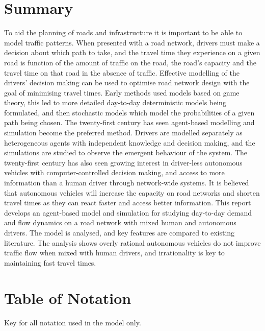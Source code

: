 \documentclass[12pt, a4paper, onecolumn]{article}
\begin{document}
\section*{Summary}
To aid the planning of roads and infrastructure it is important to be able to model traffic patterns. When presented with a road network, drivers must make a decision about which path to take, and the travel time they experience on a given road is function of the amount of traffic on the road, the road's capacity and the travel time on that road in the absence of traffic. Effective modelling of the drivers' decision making can be used to optimise road network design with the goal of minimising travel times. Early methods used models based on game theory, this led to more detailed day-to-day deterministic models being formulated, and then stochastic models which model the probabilities of a given path being chosen. The twenty-first century has seen agent-based modelling and simulation become the preferred method. Drivers are modelled separately as heterogeneous agents with independent knowledge and decision making, and the simulations are studied to observe the emergent behaviour of the system. The twenty-first century has also seen growing interest in driver-less autonomous vehicles with computer-controlled decision making, and access to more information than a human driver through network-wide systems. It is believed that autonomous vehicles will increase the capacity on road networks and shorten travel times as they can react faster and access better information. This report develops an agent-based model and simulation for studying day-to-day demand and flow dynamics on a road network with mixed human and autonomous drivers. The model is analysed, and key features are compared to existing literature. The analysis shows overly rational autonomous vehicles do not improve traffic flow when mixed with human drivers, and irrationality is key to maintaining fast travel times.

\pagebreak


\tableofcontents
\pagebreak

\section*{Table of Notation}
Key for all notation used in the model only.
\end{document}
